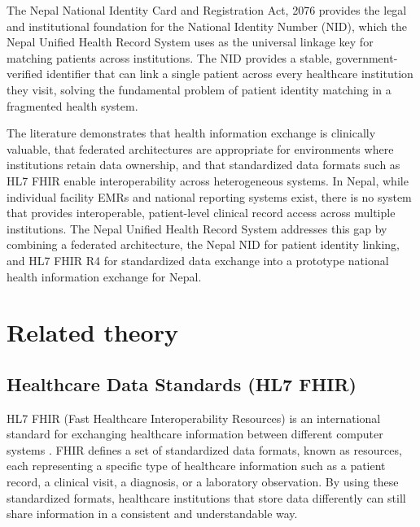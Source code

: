 \documentclass[12pt]{report}
\numberwithin{equation}{chapter}
\begin{document}
The Nepal National Identity Card and Registration Act, 2076 \cite{nidact} provides the legal and institutional foundation for the National Identity Number (NID), which the Nepal Unified Health Record System uses as the universal linkage key for matching patients across institutions. The NID provides a stable, government-verified identifier that can link a single patient across every healthcare institution they visit, solving the fundamental problem of patient identity matching in a fragmented health system.

The literature demonstrates that health information exchange is clinically valuable, that federated architectures are appropriate for environments where institutions retain data ownership, and that standardized data formats such as HL7 FHIR enable interoperability across heterogeneous systems. In Nepal, while individual facility EMRs and national reporting systems exist, there is no system that provides interoperable, patient-level clinical record access across multiple institutions. The Nepal Unified Health Record System addresses this gap by combining a federated architecture, the Nepal NID for patient identity linking, and HL7 FHIR R4 for standardized data exchange into a prototype national health information exchange for Nepal.

\section{Related theory}
\subsection{Healthcare Data Standards (HL7 FHIR)}
HL7 FHIR (Fast Healthcare Interoperability Resources) is an international standard for exchanging healthcare information between different computer systems \cite{hl7spec}. FHIR defines a set of standardized data formats, known as resources, each representing a specific type of healthcare information such as a patient record, a clinical visit, a diagnosis, or a laboratory observation. By using these standardized formats, healthcare institutions that store data differently can still share information in a consistent and understandable way.
\end{document}
